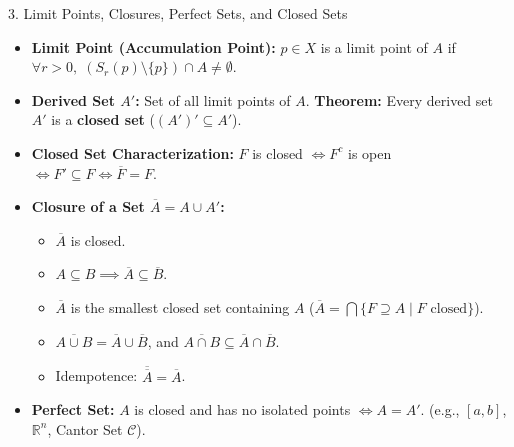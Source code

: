 \documentclass[11pt,a4paper]{article}
\begin{document}
\begin{exbox}{3. Limit Points, Closures, Perfect Sets, and Closed Sets}
\begin{itemize}
    \item \textbf{Limit Point (Accumulation Point):} $p \in X$ is a limit point of $A$ if $\forall r > 0, \; (S_r(p) \setminus \{p\}) \cap A \neq \emptyset$.
    \item \textbf{Derived Set $A'$:} Set of all limit points of $A$. \textbf{Theorem:} Every derived set $A'$ is a \textbf{closed set} ($(A')' \subseteq A'$).
    \item \textbf{Closed Set Characterization:} $F$ is closed $\iff F^c$ is open $\iff F' \subseteq F \iff \overline{F} = F$.
    \item \textbf{Closure of a Set $\overline{A} = A \cup A'$:}
    \begin{itemize}
        \item $\overline{A}$ is closed.
        \item $A \subseteq B \implies \overline{A} \subseteq \overline{B}$.
        \item $\overline{A}$ is the smallest closed set containing $A$ ($\overline{A} = \bigcap \{F \supseteq A \mid F \text{ closed}\}$).
        \item $\overline{A \cup B} = \overline{A} \cup \overline{B}$, and $\overline{A \cap B} \subseteq \overline{A} \cap \overline{B}$.
        \item Idempotence: $\overline{\overline{A}} = \overline{A}$.
    \end{itemize}
    \item \textbf{Perfect Set:} $A$ is closed and has no isolated points $\iff A = A'$. (e.g., $[a, b]$, $\mathbb{R}^n$, Cantor Set $\mathcal{C}$).
\end{itemize}
\end{exbox}
\end{document}
